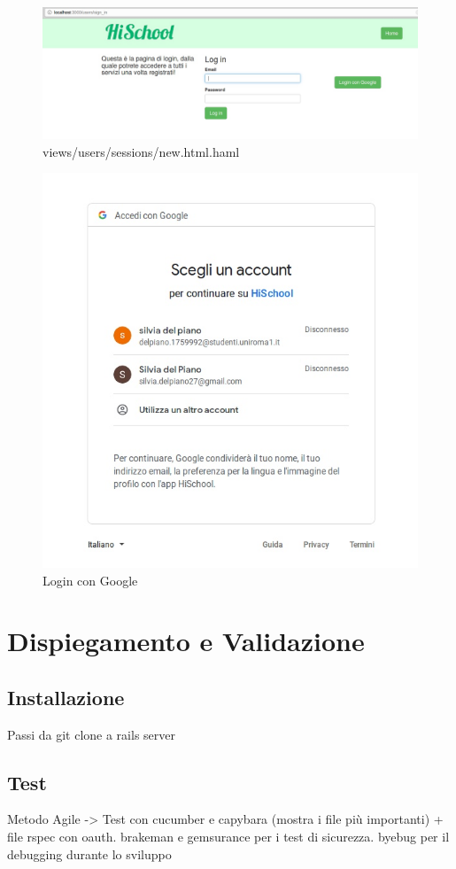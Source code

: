 \documentclass[Lau, binding=0.6cm, oneside]{sapthesis}
\begin{document}
\begin{figure}[H]
	\centering
	\includegraphics[width=1\linewidth]{images/login} 
	\caption{views/users/sessions/new.html.haml}
	\label{fig:login}
\end{figure}

\begin{figure}[H]
	\centering
	\includegraphics[width=1\linewidth]{images/google_oauth} 
	\caption{Login con Google}
	\label{fig:google_oauth}
\end{figure}


\chapter{Dispiegamento e Validazione}

\section{Installazione}

Passi da git clone a rails server

\section{Test}

Metodo Agile -> Test con cucumber e capybara (mostra i file più importanti) + file rspec con oauth. brakeman e gemsurance per i test di sicurezza. byebug per il debugging durante lo sviluppo 
\end{document}
